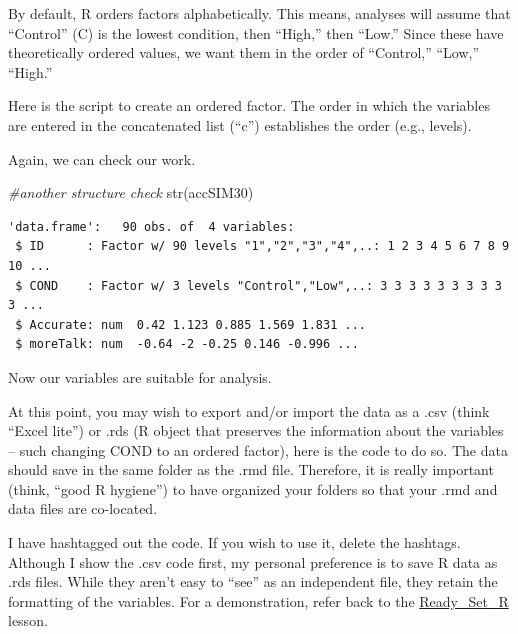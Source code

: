 \documentclass[
  11pt,
]{book}
\newenvironment{Shaded}{\begin{snugshade}}{\end{snugshade}}
\newcommand{\AttributeTok}[1]{\textcolor[rgb]{0.77,0.63,0.00}{#1}}
\newcommand{\CommentTok}[1]{\textcolor[rgb]{0.56,0.35,0.01}{\textit{#1}}}
\newcommand{\FunctionTok}[1]{\textcolor[rgb]{0.00,0.00,0.00}{#1}}
\newcommand{\NormalTok}[1]{#1}
\newcommand{\OtherTok}[1]{\textcolor[rgb]{0.56,0.35,0.01}{#1}}
\newcommand{\SpecialCharTok}[1]{\textcolor[rgb]{0.00,0.00,0.00}{#1}}
\newcommand{\StringTok}[1]{\textcolor[rgb]{0.31,0.60,0.02}{#1}}
\begin{document}
By default, R orders factors alphabetically. This means, analyses will assume that ``Control'' (C) is the lowest condition, then ``High,'' then ``Low.'' Since these have theoretically ordered values, we want them in the order of ``Control,'' ``Low,'' ``High.''

Here is the script to create an ordered factor. The order in which the variables are entered in the concatenated list (``c'') establishes the order (e.g., levels).

\begin{Shaded}
\end{Shaded}

Again, we can check our work.

\begin{Shaded}
\begin{Highlighting}[]
\CommentTok{\#another structure check}
\FunctionTok{str}\NormalTok{(accSIM30)}
\end{Highlighting}
\end{Shaded}

\begin{verbatim}
'data.frame':   90 obs. of  4 variables:
 $ ID      : Factor w/ 90 levels "1","2","3","4",..: 1 2 3 4 5 6 7 8 9 10 ...
 $ COND    : Factor w/ 3 levels "Control","Low",..: 3 3 3 3 3 3 3 3 3 3 ...
 $ Accurate: num  0.42 1.123 0.885 1.569 1.831 ...
 $ moreTalk: num  -0.64 -2 -0.25 0.146 -0.996 ...
\end{verbatim}

Now our variables are suitable for analysis.

At this point, you may wish to export and/or import the data as a .csv (think ``Excel lite'') or .rds (R object that preserves the information about the variables -- such changing COND to an ordered factor), here is the code to do so. The data should save in the same folder as the .rmd file. Therefore, it is really important (think, ``good R hygiene'') to have organized your folders so that your .rmd and data files are co-located.

I have hashtagged out the code. If you wish to use it, delete the hashtags. Although I show the .csv code first, my personal preference is to save R data as .rds files. While they aren't easy to ``see'' as an independent file, they retain the formatting of the variables. For a demonstration, refer back to the \protect\hyperlink{Ready}{Ready\_Set\_R} lesson.
\end{document}
